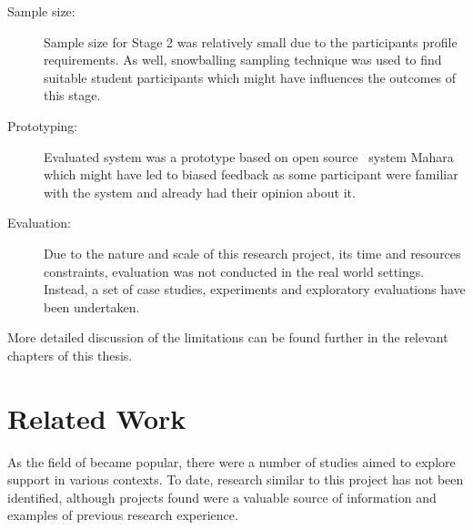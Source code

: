\begin{description}
\item[Sample size:] Sample size for Stage 2 was relatively small due to the
participants profile requirements. As well, snowballing sampling technique was
used to find suitable student participants which might have influences the
outcomes of this stage.
\item[Prototyping:] Evaluated system was a prototype based on open source
\ep~system Mahara which might have led to biased feedback as some participant
were familiar with the system and already had their opinion about it.
\item[Evaluation:] Due to the nature and scale of this research project, its
time and resources constraints, evaluation was not conducted in the real world
settings. Instead, a set of case studies, experiments and exploratory
evaluations have been undertaken.
\end{description}

More detailed discussion of the limitations can be found further in the relevant
chapters of this thesis.

\section{Related Work}
\label{sec:related}
As the field of \LLLs became popular, there were a number of studies aimed to
explore \LLLs support in various contexts. To date, research similar to this
project has not been identified, although projects found were a valuable source
of information and examples of previous research experience.

